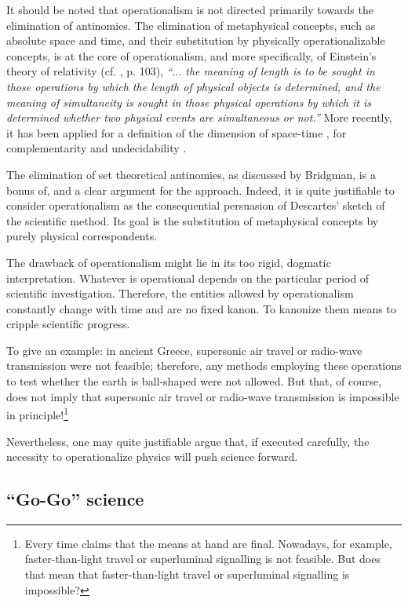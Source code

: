 It should be noted that
operationalism is not directed primarily towards the elimination of
antinomies.
The
elimination of metaphysical concepts, such as absolute space and time,
and their substitution by physically
operationalizable concepts, is at the core of operationalism, and more
specifically, of Einstein's theory of relativity (cf. \cite{bridgman},
p. 103),
{\em ``$\ldots$ the
meaning of length is to be sought in those operations by which the
length of physical objects is determined, and the meaning of
simultaneity is sought in those physical operations by which it is
determined whether two physical events are simultaneous or not.''}
More recently, it has been applied for a definition of the dimension of
space-time
\cite{zeilinger-svozil,svozil86}, for
complementarity  \cite{svozil-93,schaller-svozil}
and undecidability
\cite{svozil-93}.

The elimination of set theoretical antinomies, as discussed by Bridgman,
is a bonus of, and a clear argument for the approach.
Indeed, it is quite justifiable to consider operationalism
as the consequential persuasion of Descartes' \cite{descartes} sketch of
the scientific method.
Its goal is the substitution of metaphysical concepts by purely physical
correspondents.

The drawback of operationalism might lie in its too rigid, dogmatic
interpretation. Whatever is operational depends on the particular period
of scientific investigation. Therefore, the entities allowed by
operationalism constantly change with time and are no fixed kanon. To
kanonize them means to cripple scientific progress.


To give an example:  in ancient Greece, supersonic air travel or
radio-wave transmission were not feasible; therefore, any methods
employing these operations to test whether the earth is ball-shaped were
not allowed. But that, of course, does not imply that
supersonic air travel or
radio-wave transmission is impossible in principle!\footnote{
Every time claims that the means at hand are final.
Nowadays, for example, faster-than-light travel or superluminal
signalling is not feasible. But does that mean that
faster-than-light travel or superluminal signalling is impossible?}

Nevertheless, one may quite justifiable argue that, if executed
carefully,  the necessity to operationalize physics will push science
forward.


\subsection{``Go-Go'' science}


